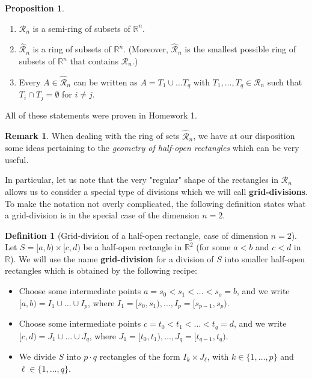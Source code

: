 \documentclass[11pt]{article}
\makeatletter
\theoremstyle{definition}
\newtheorem{defn}[thm]{Definition}
\newtheorem{prop}[thm]{Proposition}
\newtheorem{remark}[thm]{Remark}
\newcommand{\R}{\ensuremath{\mathbb{R}}}
\newenvironment{pf}[1][\proofname]{\par
  \pushQED{\qed}%
  \normalfont \topsep0\p@\relax
  \trivlist
  \item[\hskip\labelsep\itshape
  #1\@addpunct{.}]\ignorespaces
}{%
  \popQED\endtrivlist\@endpefalse
}
\makeatother
\begin{document}
\begin{prop}~ \vspace{-1.5ex}
\begin{enumerate}[(1)]
\item $\mathcal{R}_n$ is a semi-ring of subsets of $\R^n$.
\item $\widehat{\mathcal{R}}_n$ is a ring of subsets of $\R^n$. (Moreover, $\widehat{\mathcal{R}}_n$ is the smallest possible ring of subsets of $\R^n$ that contains $\mathcal{R}_n$.)
\item Every $A \in \widehat{\mathcal{R}}_n$ can be written as $A = T_1 \cup \dots T_q$ with $T_1, \dots, T_q \in \mathcal{R}_n$ such that $T_i \cap T_j = \emptyset$ for $i \ne j$.
\end{enumerate}
\end{prop}
\begin{pf} 
All of these statements were proven in Homework 1.
\end{pf}

\begin{remark}
When dealing with the ring of sets $\widehat{\mathcal{R}}_n$, we have at our disposition some ideas pertaining to the {\it geometry of half-open rectangles} which can be very useful.

In particular, let us note that the very "regular" shape of the rectangles in $\mathcal{R}_n$ allows us to consider a special type of divisions which we will call {\bf grid-divisions}. To make the notation not overly complicated, the following definition states what a grid-division is in the special case of the dimension $n = 2$.
\end{remark}

\begin{defn}[Grid-division of a half-open rectangle, case of dimension $n = 2$]~ \\
Let $S = [a, b) \times [c, d)$ be a half-open rectangle in $\R^2$ (for some $a < b$ and $c < d$ in $\R$). We will use the name {\bf grid-division} for a division of $S$ into smaller half-open rectangles which is obtained by the following recipe: \vspace{-1.5ex}
\begin{itemize}
    \item Choose some intermediate points $a = s_0 < s_1 < \dots < s_o = b$, and we write $[a, b) = I_1 \cup \dots \cup I_p$, where $I_1 = [s_0, s_1), \dots, I_p = [s_{p-1}, s_p)$.
    \item Choose some intermediate points $c = t_0 < t_1 < \dots < t_q = d$, and we write $[c, d) = J_1 \cup \dots \cup J_q$, where $J_1 = [t_0, t_1), \dots, J_q = [t_{q-1}, t_q)$.
    \item We divide $S$ into $p \cdot q$ rectangles of the form $I_k \times J_\ell$, with $k \in \{1, \dots, p\}$ and $\ell \in \{1, \dots, q\}$.
\end{itemize}
\end{defn}
\end{document}
